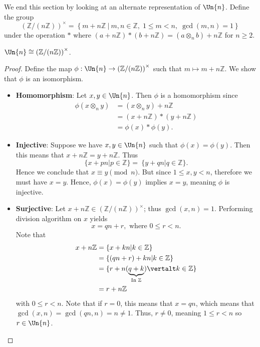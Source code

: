 We end this section by looking at an alternate representation of $\Un{n}$. Define the group
\[
    \left(\mathbb{Z}/(n\mathbb{Z})\right)^{\times} = \left\{m + n\mathbb{Z} \ \vert \ m,n \in \mathbb{Z},\; 1 \leq m < n,\; \gcd(m, n)=1\right\}
\]
under the operation $\ast$ where $(a+n\mathbb{Z})\ast(b+n\mathbb{Z}) = (a\otimes_n b) + n\mathbb{Z}$ for $n \geq 2$.
\begin{proposition}
    $\Un{n} \cong \left(\mathbb{Z}/(n\mathbb{Z})\right)^{\times}$.
\end{proposition}
\begin{proof}
    Define the map $\phi: \Un{n} \to \left(\mathbb{Z}/(n\mathbb{Z})\right)^{\times}$ such that $m \mapsto m + n\mathbb{Z}$. We show that $\phi$ is an isomorphism.

    \begin{itemize}
        \item \textbf{Homomorphism}: Let $x, y \in \Un{n}$. Then $\phi$ is a homomorphism since
        \begin{align*}
            \phi(x \otimes_n y) &= (x \otimes_n y) + n\mathbb{Z}\\
            &= (x + n\mathbb{Z}) \ast (y + n\mathbb{Z})\\
            &= \phi(x) \ast \phi(y).
        \end{align*}

        \item \textbf{Injective}: Suppose we have $x, y \in \Un{n}$ such that $\phi(x) = \phi(y)$. Then this means that $x + n\mathbb{Z} = y + n\mathbb{Z}$. Thus
        \[
            \{x + pn \vert p \in \mathbb{Z} \} = \ \{y + qn \vert q \in \mathbb{Z} \}.
        \]
        Hence we conclude that $x \equiv y \pmod{n}$. But since $1 \leq x, y < n$, therefore we must have $x = y$. Hence, $\phi(x) = \phi(y)$ implies $x = y$, meaning $\phi$ is injective.

        \item \textbf{Surjective}: Let $x + n\mathbb{Z} \in \left(\mathbb{Z}/(n\mathbb{Z})\right)^{\times}$; thus $\gcd(x, n) = 1$. Performing division algorithm on $x$ yields
        \[
            x = qn + r, \text{ where } 0 \leq r < n.
        \]
        Note that
        \begin{align*}
            x + n\mathbb{Z} &= \{x + kn \vert k \in \mathbb{Z}\}\\
            &= \{(qn + r) + kn \vert k \in \mathbb{Z}\}\\
            &= \{r + n(\underbrace{q+k}_{\text{In } \mathbb{Z}}) \vertalt k \in \mathbb{Z}\}\\
            &= r + n\mathbb{Z}
        \end{align*}
        with $0 \leq r < n$. Note that if $r = 0$, this means that $x = qn$, which means that $\gcd(x, n) = \gcd(qn, n) = n \neq 1$. Thus, $r \neq 0$, meaning $1 \leq r < n$ so $r \in \Un{n}$.


\end{itemize}
\end{proof}
